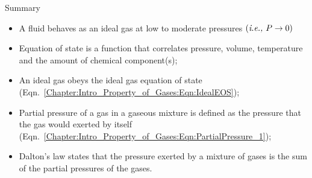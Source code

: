    
\clearpage   
\begin{FinalSummaryBlock}{Summary}
    \begin{itemize}
       \item A fluid behaves as an ideal gas at low to moderate pressures $\left(\text{{\it i.e., }} P\rightarrow 0\right)$
       \item Equation of state is a function that correlates pressure, volume, temperature and the amount of chemical component(s);
       \item An ideal gas obeys the ideal gas equation of state (Eqn.~\ref{Chapter:Intro_Property_of_Gases:Eqn:IdealEOS});
       \item Partial pressure of a gas in a gaseous mixture is defined as the pressure that the gas would exerted by itself (Eqn.~\ref{Chapter:Intro_Property_of_Gases:Eqn:PartialPressure_1});
       \item Dalton's law states that the pressure exerted by a mixture of gases is the sum of the partial pressures of the gases.
    \end{itemize}
\end{FinalSummaryBlock}
